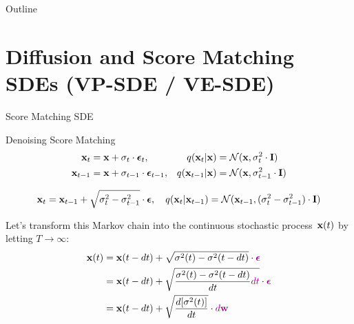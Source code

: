\documentclass{beamer}
\renewcommand{\eqpause}{}
\renewcommand{\nextonslide}[1]{#1}
\begin{document}
\begin{frame}
\titlepage
	\resetonslide	
\end{frame}






\begin{frame}{Outline}
	\tableofcontents[part=10]
\end{frame}
\section{Diffusion and Score Matching SDEs (VP-SDE / VE-SDE)}
\begin{frame}{Score Matching SDE}
	\vspace{-0.3cm}
	\begin{block}{Denoising Score Matching}
		\vspace{-0.7cm}
		\begin{align*}
			\mathbf{x}_t &= \mathbf{x} + \sigma_t \cdot \boldsymbol{\epsilon}_t, & q(\mathbf{x}_t | \mathbf{x}) &= \mathcal{N}(\mathbf{x}, \sigma_t^2 \cdot \mathbf{I}) \\
			\mathbf{x}_{t-1} &= \mathbf{x} + \sigma_{t-1} \cdot \boldsymbol{\epsilon}_{t-1}, & q(\mathbf{x}_{t-1} | \mathbf{x}) &= \mathcal{N}(\mathbf{x}, \sigma_{t-1}^2 \cdot \mathbf{I})
		\end{align*}
	\end{block}
	\eqpause
	\vspace{-1.0cm}
	\[
		\mathbf{x}_t = \mathbf{x}_{t - 1} + \sqrt{\sigma^2_t - \sigma^2_{t-1}} \cdot \boldsymbol{\epsilon}, \quad q(\mathbf{x}_{t} | \mathbf{x}_{t-1}) = \mathcal{N}(\mathbf{x}_{t-1}, (\sigma_t^2 - \sigma_{t-1}^2) \cdot \mathbf{I})
	\]
	\eqpause
	Let's transform this Markov chain into the continuous stochastic process~$\mathbf{x}(t)$ by letting $T \rightarrow \infty$:
	\vspace{-0.3cm}
	\begin{align*}
		\bx(t) &= \bx(t - dt) + \sqrt{\sigma^2(t) - \sigma^2(t - dt)} \cdot {\color{violet}\bepsilon}
		\nextonslide{\\ &= \bx(t - dt) + \sqrt{\frac{\sigma^2(t) - \sigma^2(t - dt)}{dt} {\color{violet}dt}} \cdot {\color{violet}\bepsilon}}
		 \nextonslide{\\ &= \bx(t - dt) + \sqrt{\frac{ d [\sigma^2(t)]}{dt}} \cdot {\color{violet}d \bw}}
	\end{align*}
	\vspace{-0.5cm}
\end{frame}
\end{document}
